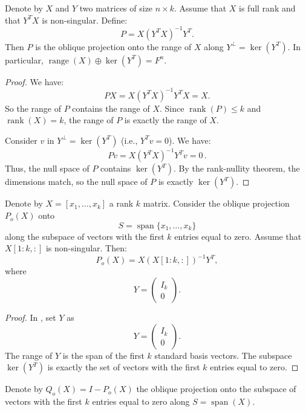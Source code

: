 \documentclass[10pt,twoside]{siamart1116}
\DeclareMathOperator{\rk}{rank}
\DeclareMathOperator{\spn}{span}
\DeclareMathOperator{\range}{range}
\newcommand{\by}{\times}
\numberwithin{theorem}{section}
\begin{document}
\begin{lemma}\label{lem:oblique_projection}
  Denote by $X$ and $Y$ two matrices of size $n \by k$. Assume that $X$ is full rank and that $Y^T X$ is non-singular. Define:
  \[ P = X {(Y^T X)}^{-1} Y^T. \]
  Then $P$ is the oblique projection onto the range of $X$ along $Y^\perp = \ker(Y^T)$. In particular, $\range(X) \oplus \ker(Y^T) = F^n$.
\end{lemma}

\begin{proof}
  We have:
  \[ P X = X {(Y^T X)}^{-1} Y^T X = X. \]
  So the range of $P$ contains the range of $X$. Since $\rk(P) \le k$ and $\rk(X)=k$, the range of $P$ is exactly the range of $X$.

  Consider $v$ in $Y^\perp = \ker(Y^T)$ (i.e., $Y^T v = 0$). We have:
  \[ P v = X {(Y^T X)}^{-1} Y^T v = 0 \,. \]
  Thus, the null space of $P$ contains $\ker(Y^T)$. By the rank-nullity theorem, the dimensions match, so the null space of $P$ is exactly $\ker(Y^T)$.
\end{proof}

\begin{lemma}\label{lem:oblique_projection_specific}
  Denote by $X = [x_1, \ldots, x_k]$ a rank $k$ matrix. Consider the oblique projection $P_o(X)$ onto
  \[ S = \spn\{ x_1,\dots,x_k \} \] %
  along the subspace of vectors with the first $k$ entries equal to zero. Assume that $X[1:k,:]$ is non-singular. Then:
  \[ P_o(X) = X {(X[1:k,:])}^{-1} Y^T, \]
  where
  \[ Y =
    \begin{pmatrix}
      I_k \\ 0
  \end{pmatrix}. \]
\end{lemma}

\begin{proof}
  In , set $Y$ as
  \[ Y =
    \begin{pmatrix}
      I_k \\ 0
  \end{pmatrix}. \]
  The range of $Y$ is the span of the first $k$ standard basis vectors. The subspace $\ker(Y^T)$ is exactly the set of vectors with the first $k$ entries equal to zero.
\end{proof}

Denote by $Q_o(X) = I - P_o(X)$ the oblique projection onto the subspace of vectors with the first $k$ entries equal to zero along $S=\spn(X)$.
\end{document}
